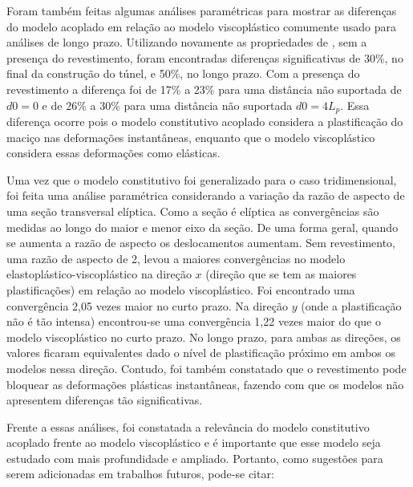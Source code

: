 Foram também feitas algumas análises paramétricas para mostrar as diferenças do modelo acoplado em relação ao modelo viscoplástico comumente usado para análises de longo prazo. Utilizando novamente as propriedades de , sem a presença do revestimento, foram encontradas diferenças significativas de 30\%, no final da construção do túnel, e 50\%, no longo prazo. Com a presença do revestimento a diferença foi de 17\% a 23\% para uma distância não suportada de $d0=0$ e de 26\% a 30\% para uma distância não suportada $d0=4L_p$. Essa diferença ocorre pois o modelo constitutivo acoplado considera a plastificação do maciço nas deformações instantâneas, enquanto que o modelo viscoplástico considera essas deformações como elásticas.

Uma vez que o modelo constitutivo foi generalizado para o caso tridimensional, foi feita uma análise paramétrica considerando a variação da razão de aspecto de uma seção transversal elíptica. Como a seção é elíptica as convergências são medidas ao longo do maior e menor eixo da seção. De uma forma geral, quando se aumenta a razão de aspecto os deslocamentos aumentam. Sem revestimento, uma razão de aspecto de 2, levou a maiores convergências no modelo elastoplástico-viscoplástico na direção $x$ (direção que se tem as maiores plastificações) em relação ao modelo viscoplástico. Foi encontrado uma convergência 2,05 vezes maior no curto prazo. Na direção $y$ (onde a plastificação não é tão intensa) encontrou-se uma convergência 1,22 vezes maior do que o modelo viscoplástico no curto prazo. No longo prazo, para ambas as direções, os valores ficaram equivalentes dado o nível de plastificação próximo em ambos os modelos nessa direção. Contudo, foi também constatado que o revestimento pode bloquear as deformações plásticas instantâneas, fazendo com que os modelos não apresentem diferenças tão significativas.

Frente a essas análises, foi constatada a relevância do modelo constitutivo acoplado frente ao modelo viscoplástico e é importante que esse modelo seja estudado com mais profundidade e ampliado. Portanto, como sugestões para serem adicionadas em trabalhos futuros, pode-se citar:

